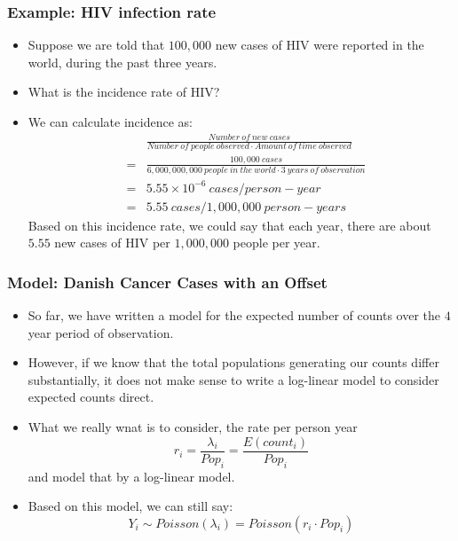 \documentclass[10pt,xcolor={svgnames},t]{beamer}
\begin{document}
\begin{frame}
	\frametitle{Example: HIV infection rate}
	
	\begin{itemize}
		\item Suppose we are told that $100,000$ new cases of HIV were reported in the world, during the past three years.
		\item What is the incidence rate of HIV?
		\item We can calculate incidence as:
		\begin{eqnarray*}
			& &\frac{Number\ of\ new\ cases}{Number\ of\ people\ observed \cdot Amount\ of\ time\ observed} \\
			&=& \frac{100,000\ cases}{6,000,000,000\ people\ in\ the\ world \cdot 3\ years\ of\ observation}\\
			&=& 5.55 \times 10^{-6} \ cases / person - year \\
			&=& 5.55\ cases/ 1,000,000\ person - years
		\end{eqnarray*}
		Based on this incidence rate, we could say that each year, there are about $5.55$ new cases of HIV per $1,000,000$ people per year.
	\end{itemize}
	
	
\end{frame}
%

\begin{frame}
	\frametitle{Model: Danish Cancer Cases with an Offset}
	
	\begin{itemize}
		\item So far, we have written a model for the expected number of counts over the $4$ year period of observation.
		\item However, if we know that the total populations generating our counts differ substantially, it does not make sense to write a log-linear model to consider expected counts direct.
		\item What we really wnat is to consider, the rate per person year
		\[ r_i = \frac{\lambda_i } {Pop_i}=\frac{E(count_i )}{Pop_i}
		\]
		and model that by a log-linear model.
		\item Based on this model, we can still say:
		\[ Y_i \sim Poisson(\lambda_i )=Poisson(r_i \cdot Pop_i)
		\]
	\end{itemize}
	
	
\end{frame}
%
\end{document}
